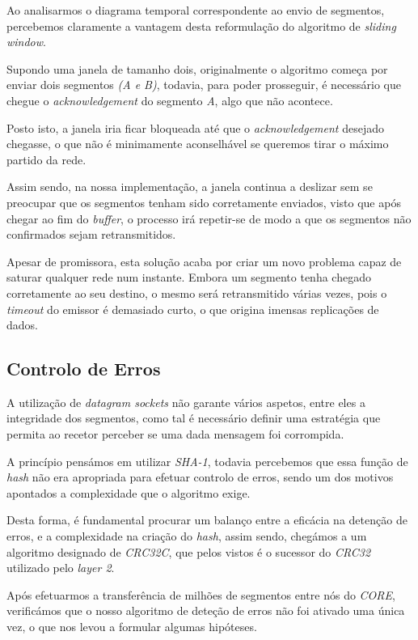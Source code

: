         Ao analisarmos o diagrama temporal correspondente ao envio de segmentos, percebemos claramente a vantagem desta reformulação do algoritmo de \textit{sliding window}.

        Supondo uma janela de tamanho dois, originalmente o algoritmo começa por enviar dois segmentos \textit{(A e B)}, todavia, para poder prosseguir, é necessário que chegue o \textit{acknowledgement} do segmento \textit{A}, algo que não acontece.

        Posto isto, a janela iria ficar bloqueada até que o \textit{acknowledgement} desejado chegasse, o que não é minimamente aconselhável se queremos tirar o máximo partido da rede.

        Assim sendo, na nossa implementação, a janela continua a deslizar sem se preocupar que os segmentos tenham sido corretamente enviados, visto que após chegar ao fim do \textit{buffer}, o processo irá repetir-se de modo a que os segmentos não confirmados sejam retransmitidos.

        Apesar de promissora, esta solução acaba por criar um novo problema capaz de saturar qualquer rede num instante. Embora um segmento tenha chegado corretamente ao seu destino, o mesmo será retransmitido várias vezes, pois o \textit{timeout} do emissor é demasiado curto, o que origina imensas replicações de dados.

    \subsection{Controlo de Erros}

        A utilização de \textit{datagram sockets} não garante vários aspetos, entre eles a integridade dos segmentos, como tal é necessário definir uma estratégia que permita ao recetor perceber se uma dada mensagem foi corrompida.

        A princípio pensámos em utilizar \textit{SHA-1}, todavia percebemos que essa função de \textit{hash} não era apropriada para efetuar controlo de erros, sendo um dos motivos apontados a complexidade que o algoritmo exige.

        Desta forma, é fundamental procurar um balanço entre a eficácia na detenção de erros, e a complexidade na criação do \textit{hash}, assim sendo, chegámos a um algoritmo designado de \textit{CRC32C}, que pelos vistos é o sucessor do \textit{CRC32} utilizado pelo \textit{layer 2}.

        Após efetuarmos a transferência de milhões de segmentos entre nós do \textit{CORE}, verificámos que o nosso algoritmo de deteção de erros não foi ativado uma única vez, o que nos levou a formular algumas hipóteses.

